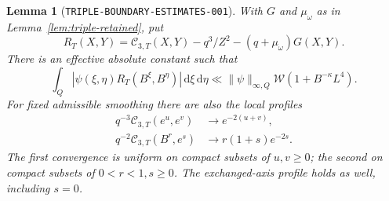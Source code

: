 \documentclass[11pt]{article}
\newtheorem{lemma}{Lemma}
\newcommand{\CT}{\mathcal C_{3,T}}
\newcommand{\dd}{\,\mathrm d}
\begin{document}
\begin{lemma}[\texttt{TRIPLE-BOUNDARY-ESTIMATES-001}]
\label{lem:triple-boundary-estimates}
With \(G\) and \(\mu_\omega\) as in Lemma~\ref{lem:triple-retained}, put
\[
 R_T(X,Y)=\CT(X,Y)-q^3/Z^2-(q+\mu_\omega)G(X,Y).
\]
There is an effective absolute constant such that
\begin{equation}\label{eq:triple-boundary-integrated-error}
 \int_Q|\psi(\xi,\eta)R_T(B^\xi,B^\eta)|\dd\xi\dd\eta
 \ll\|\psi\|_{\infty,Q}\mathcal W(1+B^{-\kappa}L^4).
\end{equation}
For fixed admissible smoothing there are also the local profiles
\begin{align}
 q^{-3}\CT(e^u,e^v)&\longrightarrow e^{-2(u+v)},
       \label{eq:triple-origin-profile}\\
 q^{-2}\CT(B^r,e^s)&\longrightarrow r(1+s)e^{-2s}.
       \label{eq:triple-axis-profile}
\end{align}
The first convergence is uniform on compact subsets of \(u,v\geq0\);
the second on compact subsets of \(0<r<1,s\geq0\).
The exchanged-axis profile holds as well, including \(s=0\).
\end{lemma}
\end{document}
